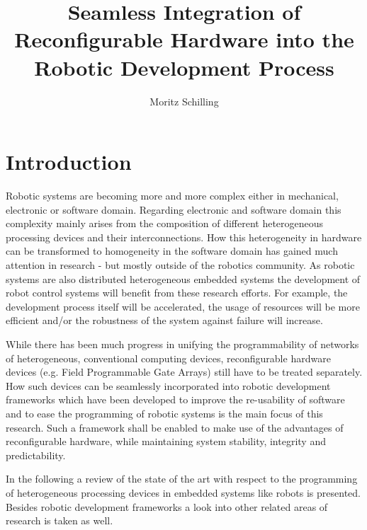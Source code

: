 \documentclass[a4paper,twocolumn]{esapub2005} %
\title{Seamless Integration of Reconfigurable Hardware into the Robotic Development Process}
\author{Moritz Schilling}
\affil{DFKI GmbH, Robert-Hooke-Str. 5, 28359 Bremen, Germany}
\affil{TEC-MMA, ESTEC, 2200 AG Noordwijk, The Netherlands}
\begin{document}
\maketitle




\section{Introduction}

Robotic systems are becoming more and more complex either in mechanical, electronic or software domain.
Regarding electronic and software domain this complexity mainly arises from the composition of different heterogeneous processing devices and their interconnections.
How this heterogeneity in hardware can be transformed to homogeneity in the software domain has gained much attention in research - but mostly outside of the robotics community.
As robotic systems are also distributed heterogeneous embedded systems the development of robot control systems will benefit from these research efforts.
For example, the development process itself will be accelerated, the usage of resources will be more efficient and/or the robustness of the system against failure will increase.

While there has been much progress in unifying the programmability of networks of heterogeneous, conventional computing devices,
reconfigurable hardware devices (e.g. Field Programmable Gate Arrays) still have to be treated separately.
How such devices can be seamlessly incorporated into robotic development frameworks which have been developed to improve the re-usability of software and to ease the programming of robotic systems is the main focus of this research.
Such a framework shall be enabled to make use of the advantages of reconfigurable hardware, while maintaining system stability, integrity and predictability.

In the following a review of the state of the art with respect to the programming of heterogeneous processing devices in embedded systems like robots is presented. Besides robotic development frameworks a look into other related areas of research is taken as well.
\end{document}
